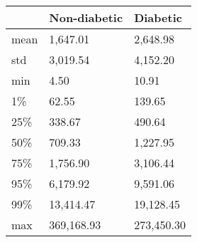 \begin{tabular}{lll}
\toprule
{} & Non-diabetic &    Diabetic \\
\midrule
mean &     1,647.01 &    2,648.98 \\
std  &     3,019.54 &    4,152.20 \\
min  &         4.50 &       10.91 \\
1\%   &        62.55 &      139.65 \\
25\%  &       338.67 &      490.64 \\
50\%  &       709.33 &    1,227.95 \\
75\%  &     1,756.90 &    3,106.44 \\
95\%  &     6,179.92 &    9,591.06 \\
99\%  &    13,414.47 &   19,128.45 \\
max  &   369,168.93 &  273,450.30 \\
\bottomrule
\end{tabular}
